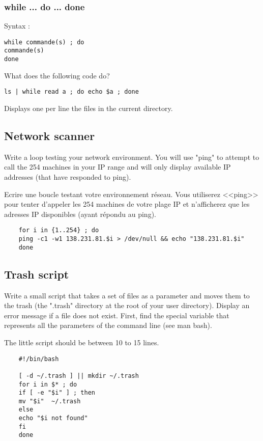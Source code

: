 \documentclass[11pt]{article}
\begin{document}
\subsubsection{while ... do ... done}

Syntax :

\begin{verbatim}
while commande(s) ; do
commande(s)
done
\end{verbatim}

What does the following code do?

\begin{lstlisting}
ls | while read a ; do echo $a ; done
\end{lstlisting}

\begin{solution}
	Displays one per line the files in the current directory.
\end{solution}

\subsection{Network scanner}
Write a loop testing your network environment. You will use "ping" to attempt to call the 254 machines in your IP range and will only display available IP addresses (that have responded to ping).

Ecrire une boucle testant votre environnement réseau. Vous utiliserez <<ping>> pour tenter d'appeler les 254 machines de votre plage IP et n'afficherez que les adresses IP disponibles (ayant répondu au ping).

\begin{solution}
	\begin{verbatim}
	for i in {1..254} ; do
	ping -c1 -w1 138.231.81.$i > /dev/null && echo "138.231.81.$i"
	done
	\end{verbatim}
\end{solution}

\subsection{Trash script}

Write a small script that takes a set of files as a parameter and moves them to the trash (the ".trash" directory at the root of your user directory).
Display an error message if a file does not exist.
First, find the special variable that represents all the parameters of the command line (see man bash).

The little script should be between 10 to 15 lines.

\begin{solution}
	\begin{verbatim}
	#!/bin/bash
	
	[ -d ~/.trash ] || mkdir ~/.trash
	for i in $* ; do
	if [ -e "$i" ] ; then
	mv "$i"  ~/.trash
	else
	echo "$i not found"
	fi
	done
	\end{verbatim}
\end{solution}
\end{document}
